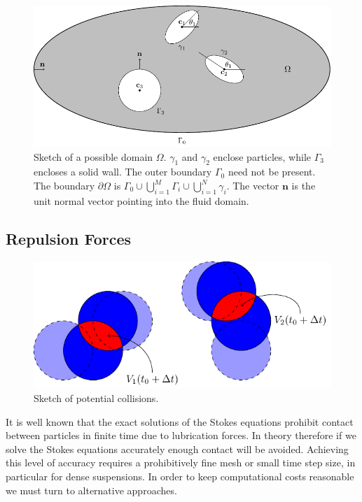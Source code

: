 \documentclass[preprint, 10pt]{elsarticle}
\begin{document}
\begin{figure}[!h]
\begin{center}
\includegraphics{figures/multiply_connected.pdf}
\end{center}
\caption{Sketch of a possible domain $\Omega$. $\gamma_1$ and $\gamma_2$ enclose particles, while $\Gamma_3$ encloses a solid wall. The outer boundary $\Gamma_0$ need not be present. The boundary $\partial\Omega$ is $\Gamma_0\cup\bigcup\limits_{i=1}^{M}\Gamma_i\cup\bigcup\limits_{i=1}^N \gamma_i$. The vector $\mathbf{n}$ is the unit normal vector pointing into the fluid domain. }
\end{figure}
\subsection{Repulsion Forces}

\begin{figure}[!h]\label{fig:collision_sketch}
\begin{center}
\includegraphics{figures/collisions.pdf}
\end{center}
\caption{Sketch of potential collisions.}
\end{figure}
It is well known that the exact solutions of the Stokes equations prohibit contact between particles in finite time due to lubrication forces. In theory therefore if we solve the Stokes equations accurately enough contact will be avoided. Achieving this level of accuracy requires a prohibitively fine mesh or small time step size, in particular for dense suspensions. In order to keep computational costs reasonable we must turn to alternative approaches. 
\end{document}
